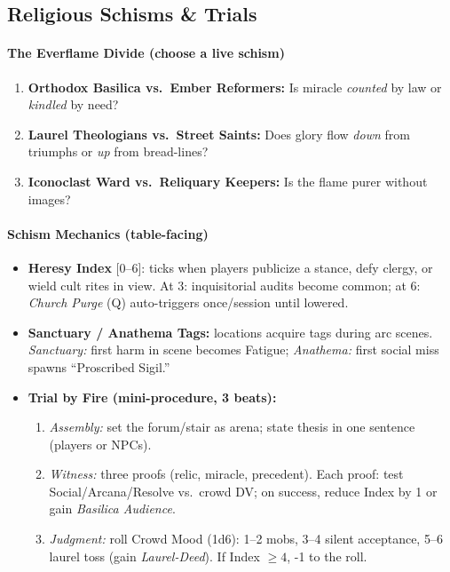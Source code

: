 \subsection*{Religious Schisms \& Trials}
\label{sec:ecktoria-schisms}
\paragraph{The Everflame Divide (choose a live schism)}
\begin{enumerate}
  \item \textbf{Orthodox Basilica vs.\ Ember Reformers:} Is miracle \emph{counted} by law or \emph{kindled} by need?
  \item \textbf{Laurel Theologians vs.\ Street Saints:} Does glory flow \emph{down} from triumphs or \emph{up} from bread-lines?
  \item \textbf{Iconoclast Ward vs.\ Reliquary Keepers:} Is the flame purer without images?
\end{enumerate}

\paragraph{Schism Mechanics (table-facing)}
\begin{itemize}
  \item \textbf{Heresy Index} [0--6]: ticks when players publicize a stance, defy clergy, or wield cult rites in view. At 3: inquisitorial audits become common; at 6: \emph{Church Purge} (Q) auto-triggers once/session until lowered.
  \item \textbf{Sanctuary / Anathema Tags:} locations acquire tags during arc scenes. \emph{Sanctuary:} first harm in scene becomes Fatigue; \emph{Anathema:} first social miss spawns “Proscribed Sigil.”
  \item \textbf{Trial by Fire (mini-procedure, 3 beats):}
  \begin{enumerate}
    \item \emph{Assembly:} set the forum/stair as arena; state thesis in one sentence (players or NPCs).
    \item \emph{Witness:} three proofs (relic, miracle, precedent). Each proof: test Social/Arcana/Resolve vs.\ crowd DV; on success, reduce Index by 1 or gain \emph{Basilica Audience}.
    \item \emph{Judgment:} roll Crowd Mood (1d6): 1–2 mobs, 3–4 silent acceptance, 5–6 laurel toss (gain \emph{Laurel-Deed}). If Index \(\geq 4\), -1 to the roll.
  \end{enumerate}
\end{itemize}

